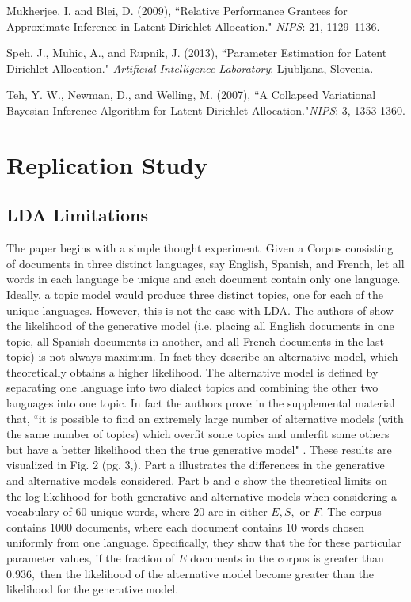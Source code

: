 \documentclass[12pt]{article}
\begin{document}
\begin{thebibliography}{4}
	Mukherjee, I. and Blei, D.  (2009),
	``Relative Performance Grantees for Approximate Inference in Latent Dirichlet Allocation." 
	\textit{NIPS}: 21, 1129–1136.
	
	Speh, J., Muhic, A., and Rupnik, J.  (2013),
	``Parameter Estimation for Latent Dirichlet Allocation." \textit{Artificial Intelligence Laboratory}: Ljubljana, Slovenia.
		
	Teh, Y. W., Newman, D., and Welling, M.  (2007),
	``A Collapsed Variational Bayesian Inference Algorithm for Latent Dirichlet 
	Allocation."\textit{NIPS}: 3, 1353-1360.
	
\end{thebibliography}

\newpage
\appendix
\section{Replication Study}
\subsection{LDA Limitations}
The paper \cite{main} begins with a simple thought experiment. Given a Corpus consisting of documents in three distinct languages, say English, Spanish, and French, let all words in each language be unique and each document contain only one language. Ideally, a topic model would produce three distinct topics, one for each of the unique languages. However, this is not the case with LDA. The authors of \cite{main} show the likelihood of the generative model (i.e. placing all English documents in one topic, all Spanish documents in another, and all French documents in the last topic) is not always maximum. In fact they describe an alternative model, which theoretically obtains a higher likelihood. The alternative model is defined by separating one language into two dialect topics and combining the other two languages into one topic. In fact the authors prove in the supplemental material that, ``it is possible to find an extremely large number of alternative models (with the same number of topics) which overfit some topics and underfit some others but have a better likelihood then the true generative model" \cite{mainExtra}. These results are visualized in Fig. 2 (pg. 3,\cite{main}). Part a illustrates the differences in the generative and alternative models considered. Part b and c show the theoretical limits on the log likelihood for both generative and alternative models when considering a vocabulary of $60$ unique words, where $20$ are in either $E, S,$ or $F$. The corpus contains $1000$ documents, where each document contains $10$ words chosen uniformly from one language. Specifically, they show that the for these particular parameter values, if the fraction of $E$ documents in the corpus is greater than $0.936,$ then the likelihood of the alternative model become greater than the likelihood for the generative model. 
\\
\end{document}
